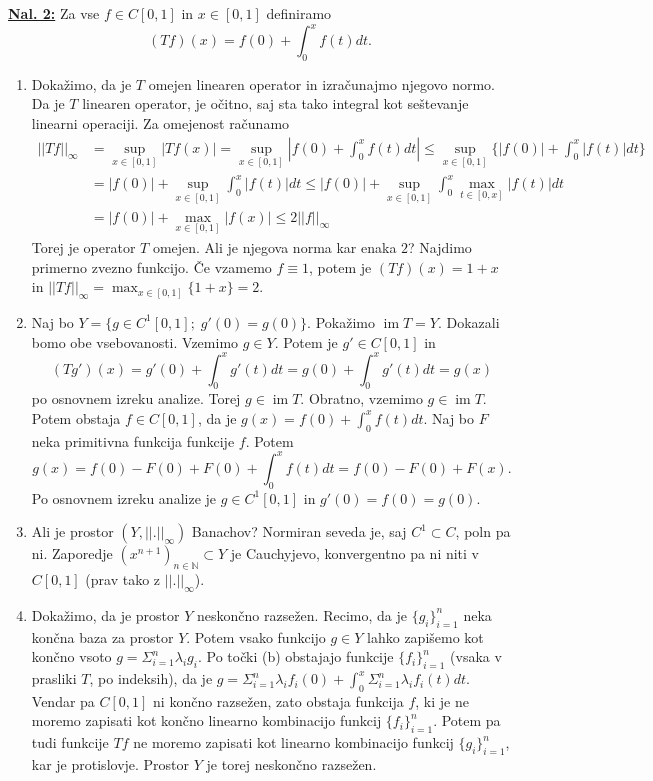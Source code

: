 \documentclass[a4paper, 12pt]{article}
\DeclareMathOperator{\im}{im}
\newcommand{\N}{\mathbb{N}}
\begin{document}
\underline{\textbf{Nal. 2:}}
Za vse $f \in C[0, 1]$ in $x \in [0, 1]$ definiramo
\[
(Tf)(x) = f(0) + \int_{0}^{x}f(t)dt.
\]
\begin{enumerate}[label=(\alph*)]
	\item Dokažimo, da je $T$ omejen linearen operator in izračunajmo njegovo normo.
	Da je $T$ linearen operator, je očitno, saj sta tako integral kot seštevanje linearni operaciji.
	Za omejenost računamo
	\begin{align*}
	||Tf||_\infty &= \sup_{x \in [0,1]}|Tf(x)| = \sup_{x \in [0,1]}|f(0) + \int_{0}^{x}f(t)dt| \leq \sup_{x \in [0,1]}\lbrace|f(0)| + \int_{0}^{x}|f(t)|dt\rbrace \\
	&= |f(0)| + \sup_{x \in [0,1]}\int_{0}^{x}|f(t)|dt \leq |f(0)| + \sup_{x \in [0,1]}\int_{0}^{x}\max_{t\in[0,x]}|f(t)|dt \\ 
	&= |f(0)| + \max_{x\in[0,1]}|f(x)| \leq 2||f||_\infty
	\end{align*}
	Torej je operator $T$ omejen. Ali je njegova norma kar enaka $2$? Najdimo primerno zvezno funkcijo. Če vzamemo $f \equiv 1$, potem je $(Tf)(x) = 1 + x$ in $||Tf||_\infty = \max_{x\in[0,1]}\lbrace 1 + x \rbrace = 2$.
	\item Naj bo $Y = \lbrace g \in C^1[0, 1] ; \; g'(0) = g(0) \rbrace$. Pokažimo $\im T = Y$. Dokazali bomo obe vsebovanosti. Vzemimo $g \in Y$. Potem je $g' \in C[0,1]$ in
	\[
	(Tg')(x) = g'(0) + \int_{0}^{x}g'(t)dt = g(0) + \int_{0}^{x}g'(t)dt = g(x)
	\]
	po osnovnem izreku analize. Torej $g \in \im T$.
	Obratno, vzemimo $g \in \im T$. Potem obstaja $f \in C[0,1]$, da je $g(x) = f(0) + \int_{0}^{x}f(t)dt$.
	Naj bo $F$ neka primitivna funkcija funkcije $f$. Potem
	\[
	g(x) = f(0) - F(0) + F(0) + \int_{0}^{x}f(t)dt = f(0) - F(0) + F(x).
	\]
	Po osnovnem izreku analize je $g \in C^1[0, 1]$ in $g'(0) = f(0) = g(0)$.
	\item Ali je prostor $(Y, ||.||_\infty)$ Banachov?
	Normiran seveda je, saj $C^1 \subset C$, poln pa ni. Zaporedje $(x^{n+1})_{n \in \N} \subset Y$ je Cauchyjevo, konvergentno pa ni niti v $C[0, 1]$ (prav tako z $||.||_\infty$).
	\item Dokažimo, da je prostor $Y$ neskončno razsežen. Recimo, da je $\lbrace g_i \rbrace_{i=1}^n$ neka končna baza za prostor $Y$. Potem vsako funkcijo $g \in Y$ lahko zapišemo kot končno vsoto $g = \Sigma_{i=1}^n\lambda_i g_i$. Po točki (b) obstajajo funkcije $\lbrace f_i \rbrace_{i=1}^n$ (vsaka v prasliki $T$, po indeksih), da je $g = \Sigma_{i=1}^n \lambda_i f_i(0) + \int_{0}^{x}\Sigma_{i=1}^n \lambda_i f_i(t)dt$. Vendar pa $C[0, 1]$ ni končno razsežen, zato obstaja funkcija $f$, ki je ne moremo zapisati kot končno linearno kombinacijo funkcij $\lbrace f_i \rbrace_{i=1}^n$. Potem pa tudi funkcije $Tf$ ne moremo zapisati kot linearno kombinacijo funkcij $\lbrace g_i \rbrace_{i=1}^n$, kar je protislovje. Prostor $Y$ je torej neskončno razsežen.

\end{enumerate}
\end{document}
